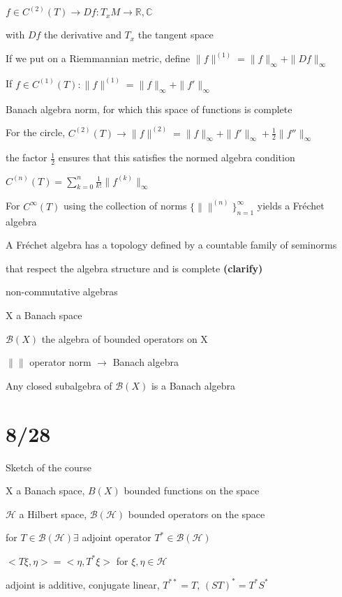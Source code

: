 \documentclass[12pt]{article}
\begin{document}
$f \in C^{(2)}(T) \to Df: T_xM \to \mathds{R}, \mathds{C}$

with $Df$ the derivative and $T_x$ the tangent space

If we put on a Riemmannian metric, define $\|f\|^{(1)} = \|f\|_\infty + \|Df\|_\infty$

If $f \in C^{(1)}(T): \|f\|^{(1)} = \|f\|_\infty + \|f'\|_\infty$

Banach algebra norm, for which this space of functions is complete

\noindent
For the circle, $C^{(2)}(T) \to \|f\|^{(2)} = \|f\|_\infty + \|f'\|_\infty + \frac{1}{2}\|f''\|_\infty$

the factor $\frac{1}{2}$ ensures that this satisfies the normed algebra condition

$C^{(n)}(T) = \sum\limits_{k=0}^n\frac{1}{k!}\|f^{(k)}\|_\infty$

For $C^\infty(T)$ using the collection of norms $\{\|\|^{(n)}\}^\infty_{n=1}$ yields a Fr\'{e}chet algebra

A Fr\'{e}chet algebra has a topology defined by a countable family of seminorms

that respect the algebra structure and is complete \textbf{(clarify)}

\noindent
non-commutative algebras

X a Banach space

$\mathscr{B}(X)$ the algebra of bounded operators on X

$\|\|$ operator norm $\to$ Banach algebra

Any closed subalgebra of $\mathscr{B}(X)$ is a Banach algebra

\section{8/28}

\noindent
Sketch of the course

\noindent
X a Banach space, $B(X)$ bounded functions on the space

\noindent
$\mathscr{H}$ a Hilbert space, $\mathscr{B}(\mathscr{H})$ bounded operators on the space

for $T \in \mathscr{B}(\mathscr{H}) \exists$ adjoint operator $T^* \in \mathscr{B}(\mathscr{H})$

$<T\xi, \eta> = <\eta, T^*\xi>$ for $\xi, \eta \in \mathscr{H}$

adjoint is additive, conjugate linear, $T^{**} = T$, $(ST)^* = T^*S^*$
\end{document}
